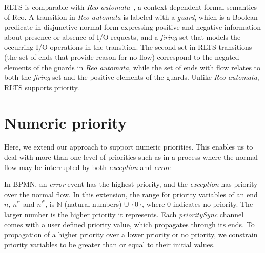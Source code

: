 %

RLTS is comparable with \emph{Reo automata}~\cite{Bonsangue2012685}, a context-dependent formal semantics of Reo. A transition in \emph{Reo automata} is labeled with a \emph{guard}, which is a Boolean predicate in disjunctive normal form expressing positive and negative information about presence or absence of I/O requests, and a \emph{firing} set that models the occurring I/O operations in the transition. The second set in RLTS transitions (the set of ends that provide reason for no flow) correspond to the negated elements of the guards in \emph{Reo automata}, while the set of ends with flow relates to both the \emph{firing} set and the positive elements of the guards. Unlike \emph{Reo automata}, RLTS supports priority.

\section{Numeric priority}
\label{sec:extension}
Here, we extend our approach to support numeric priorities. This enables us to deal with more than one level of priorities such as in a process where the normal flow may be interrupted by both \emph{exception} and \emph{error}. 
 
In BPMN, an \emph{error} event has the highest priority, and the \emph{exception} has priority over the normal flow. 
 In this extension, the range for priority variables of an end $n$, $n^{!^\circ}$ and $n^{!^\bullet}$, is $\mathbb{N}$ (natural numbers) $\cup$ $\{0\}$, where 0 indicates no priority. The larger number is the higher priority it represents. Each \emph{prioritySync} channel comes with a user defined priority value, which propagates through its ends. To propagation of a higher priority over a lower priority or no priority, we constrain priority variables to be greater than or equal to their initial values. 

